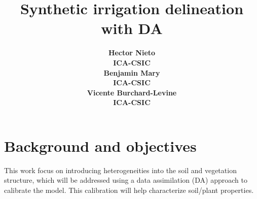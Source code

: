 \documentclass{article}
\title{Synthetic irrigation delineation with DA}
\date{\displaydate{articleDate}}
\author{\bfseries Hector Nieto\mdseries\\ICA-CSIC\\\AND\bfseries Benjamin Mary\mdseries\\ICA-CSIC\\\AND\bfseries Vicente Burchard-Levine\mdseries\\ICA-CSIC\\}
\begin{document}
\maketitle
{}

\section{Background and objectives}

This work focus on introducing heterogeneities into the soil and vegetation structure, which will be addressed using a data assimilation (DA) approach to calibrate the model.
This calibration will help characterize soil/plant properties.
\end{document}
